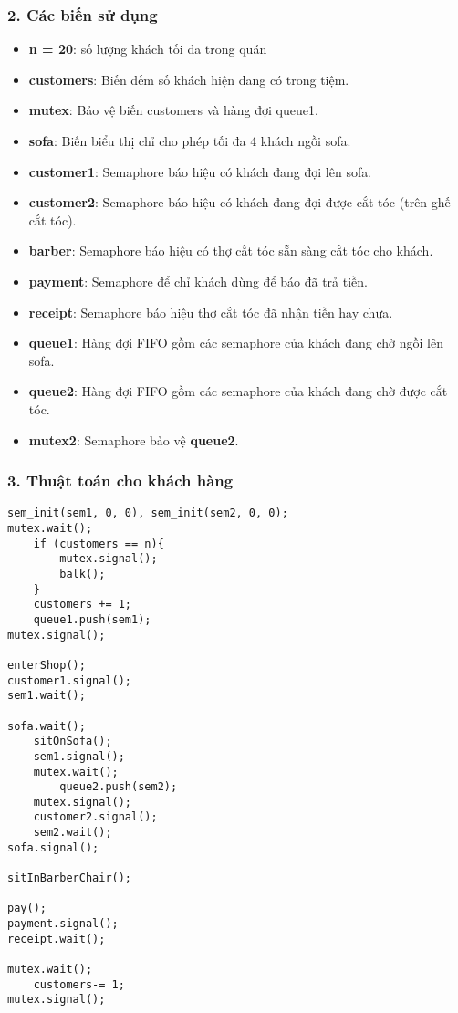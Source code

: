 \subsubsection*{2. Các biến sử dụng}
\begin{itemize}
    \item \textbf{n = 20}: số lượng khách tối đa trong quán
    \item \textbf{customers}: Biến đếm số khách hiện đang có trong tiệm.
    \item \textbf{mutex}: Bảo vệ biến customers và hàng đợi queue1.
    \item \textbf{sofa}: Biến biểu thị chỉ cho phép tối đa 4 khách ngồi sofa.
    \item \textbf{customer1}: Semaphore báo hiệu có khách đang đợi lên sofa.
    \item  \textbf{customer2}: Semaphore báo hiệu có khách đang đợi được cắt tóc (trên ghế cắt tóc).
    \item \textbf{barber}: Semaphore báo hiệu có thợ cắt tóc sẵn sàng cắt tóc cho khách.
    \item \textbf{payment}: Semaphore để chỉ khách dùng để báo đã trả tiền.
    \item \textbf{receipt}: Semaphore báo hiệu thợ cắt tóc đã nhận tiền hay chưa.
    \item \textbf{queue1}: Hàng đợi FIFO gồm các semaphore của khách đang chờ ngồi lên sofa.
    \item \textbf{queue2}: Hàng đợi FIFO gồm các semaphore của khách đang chờ được cắt tóc.
    \item \textbf{mutex2}: Semaphore bảo vệ \textbf{queue2}.
\end{itemize}
\subsubsection*{3. Thuật toán cho khách hàng}
\begin{lstlisting}
sem_init(sem1, 0, 0), sem_init(sem2, 0, 0);  
mutex.wait();
    if (customers == n){
        mutex.signal();
        balk();
    }
    customers += 1;
    queue1.push(sem1);
mutex.signal();

enterShop();
customer1.signal();
sem1.wait();    

sofa.wait();
    sitOnSofa();
    sem1.signal();
    mutex.wait();
        queue2.push(sem2);
    mutex.signal();
    customer2.signal();
    sem2.wait();
sofa.signal();
 
sitInBarberChair();

pay();
payment.signal();
receipt.wait();

mutex.wait();
    customers-= 1;
mutex.signal();
\end{lstlisting}
